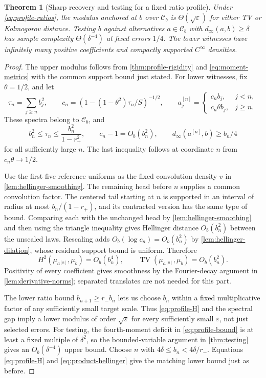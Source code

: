 \documentclass[11pt,a4paper]{article}
\numberwithin{equation}{section}
\newtheorem{theorem}{Theorem}[section]
\theoremstyle{definition}
\theoremstyle{remark}
\DeclareMathOperator{\TV}{TV}
\newcommand{\C}{\mathcal C}
\newcommand{\eps}{\varepsilon}
\begin{document}
\begin{theorem}[Sharp recovery and testing for a fixed ratio profile]
\label{thm:profile-sharp}
Under \eqref{eq:profile-ratios}, the modulus anchored at $b$ over $\C_b$
is $\Theta(\sqrt\eps)$ for either TV or Kolmogorov distance. Testing
$b$ against alternatives $a\in\C_b$ with $d_\infty(a,b)\ge\delta$ has
sample complexity $\Theta(\delta^{-4})$ at fixed errors $1/4$.
The lower witnesses have infinitely many positive coefficients and compactly
supported $C^\infty$ densities.
\end{theorem}
\begin{proof}
The upper modulus follows from \cref{thm:profile-rigidity} and
\eqref{eq:moment-metrics} with the common support bound just stated.
For lower witnesses, fix $\theta=1/2$, and let
\begin{equation}
 \tau_n=\sum_{j\ge n}b_j^2,\qquad
 c_n=\left(1-(1-\theta^2)\tau_n/S\right)^{-1/2},\qquad
 a_j^{[n]}=
 \begin{cases}c_nb_j,&j<n,\\c_n\theta b_j,&j\ge n.\end{cases}
 \label{eq:profile-witness}
\end{equation}
These spectra belong to $\C_b$, and
\[
 b_n^2\le\tau_n\le\frac{b_n^2}{1-r_+^2},\qquad
 c_n-1=O_b(b_n^2),\qquad
 d_\infty(a^{[n]},b)\ge b_n/4
\]
for all sufficiently large $n$. The last inequality follows at coordinate
$n$ from $c_n\theta\to1/2$.

Use the first five reference uniforms as the fixed convolution density $v$
in \cref{lem:hellinger-smoothing}. The remaining head before $n$ supplies
a common convolution factor. The centered tail starting at $n$ is supported
in an interval of radius at most $b_n/(1-r_+)$, and its contracted version
has the same type of bound. Comparing each with the unchanged head by
\cref{lem:hellinger-smoothing} and then using the triangle inequality gives
Hellinger distance $O_b(b_n^2)$ between the unscaled laws. Rescaling adds
$O_b(\log c_n)=O_b(b_n^2)$ by \cref{lem:hellinger-dilation}, whose residual
support bound is uniform. Therefore
\begin{equation}
 H^2(\mu_{a^{[n]}},\mu_b)=O_b(b_n^4),\qquad
 \TV(\mu_{a^{[n]}},\mu_b)=O_b(b_n^2).
 \label{eq:profile-H}
\end{equation}
Positivity of every coefficient gives smoothness by the Fourier-decay
argument in \cref{lem:derivative-norms}; separated translates are not needed
for this part.

The lower ratio bound $b_{n+1}\ge r_-b_n$ lets us choose $b_n$ within a
fixed multiplicative factor of any sufficiently small target scale. Thus
\eqref{eq:profile-H} and the spectral gap imply a lower modulus of order
$\sqrt\eps$ for every sufficiently small $\eps$, not just selected errors.
For testing, the fourth-moment deficit in \eqref{eq:profile-bound} is at
least a fixed multiple of $\delta^2$, so the bounded-variable argument in
\cref{thm:testing} gives an $O_b(\delta^{-4})$ upper bound. Choose $n$
with $4\delta\le b_n<4\delta/r_-$. Equations
\eqref{eq:profile-H} and \eqref{eq:product-hellinger} give the matching
lower bound just as before.
\end{proof}
\end{document}
